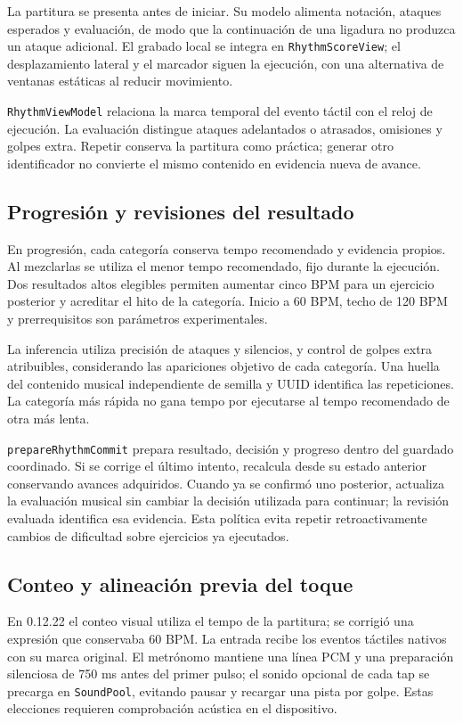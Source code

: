 La partitura se presenta antes de iniciar. Su modelo alimenta notación, ataques
esperados y evaluación, de modo que la continuación de una ligadura no produzca
un ataque adicional. El grabado local se integra en \texttt{RhythmScoreView};
el desplazamiento lateral y el marcador siguen la ejecución, con una alternativa
de ventanas estáticas al reducir movimiento.

\texttt{RhythmViewModel} relaciona la marca temporal del evento táctil con el
reloj de ejecución. La evaluación distingue ataques adelantados o atrasados,
omisiones y golpes extra. Repetir conserva la partitura como práctica; generar
otro identificador no convierte el mismo contenido en evidencia nueva de avance.

\subsection{Progresión y revisiones del resultado}
\label{sec:implementacion-ritmo-r6}
En progresión, cada categoría conserva tempo recomendado y evidencia propios.
Al mezclarlas se utiliza el menor tempo recomendado, fijo durante la ejecución.
Dos resultados altos elegibles permiten aumentar cinco BPM para un ejercicio
posterior y acreditar el hito de la categoría. Inicio a 60 BPM, techo de
120 BPM y prerrequisitos son parámetros experimentales.

La inferencia utiliza precisión de ataques y silencios, y control de golpes
extra atribuibles, considerando las apariciones objetivo de cada categoría.
Una huella del contenido musical independiente de semilla y UUID identifica
las repeticiones. La categoría más rápida no gana tempo por ejecutarse al
tempo recomendado de otra más lenta.

\texttt{prepareRhythmCommit} prepara resultado, decisión y progreso dentro del
guardado coordinado. Si se corrige el último intento, recalcula desde su estado
anterior conservando avances adquiridos. Cuando ya se confirmó uno posterior,
actualiza la evaluación musical sin cambiar la decisión utilizada para continuar;
la revisión evaluada identifica esa evidencia. Esta política evita repetir
retroactivamente cambios de dificultad sobre ejercicios ya ejecutados.

\subsection{Conteo y alineación previa del toque}
En 0.12.22 el conteo visual utiliza el tempo de la partitura; se corrigió una
expresión que conservaba 60 BPM. La entrada recibe los eventos táctiles nativos
con su marca original. El metrónomo mantiene una línea PCM y una preparación
silenciosa de 750 ms antes del primer pulso; el sonido opcional de cada tap
se precarga en \texttt{SoundPool}, evitando pausar y recargar una pista por golpe.
Estas elecciones requieren comprobación acústica en el dispositivo.

